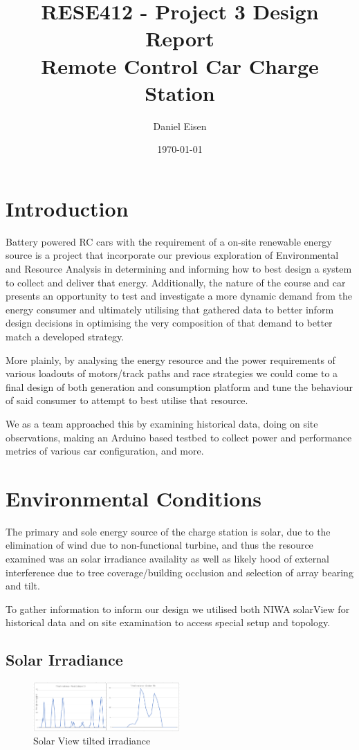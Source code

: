 \documentclass[11pt]{article}
\title{RESE412 - Project 3 Design Report \\ Remote Control Car Charge Station}
\author{Daniel Eisen}
\date{\today}
\begin{document}
\maketitle
\section{Introduction}
Battery powered RC cars with the requirement of a on-site renewable energy source is a project that incorporate our previous exploration of Environmental and Resource Analysis in determining and informing how to best design a system to collect and deliver that energy. Additionally, the nature of the course and car presents an opportunity to test and investigate a more dynamic demand from the energy consumer and ultimately utilising that gathered data to better inform design decisions in optimising the very composition of that demand to better match a developed strategy.

More plainly, by analysing the energy resource and the power requirements of various loadouts of motors/track paths and race strategies we could come to a final design of both generation and consumption platform and tune the behaviour of said consumer to attempt to best utilise that resource.  

We as a team approached this by examining historical data, doing on site observations, making an Arduino based testbed to collect power and performance metrics of various car configuration, and more.   

\section{Environmental Conditions}
The primary and sole energy source of the charge station is solar, due to the elimination of wind due to non-functional turbine, and thus the resource examined was an solar irradiance availality as well as likely hood of external interference due to tree coverage/building occlusion and selection of array bearing and tilt.

To gather information to inform our design we utilised both NIWA solarView \cite{solarview} for historical data and on site examination to access special setup and topology.

\subsection{Solar Irradiance}
\begin{figure}[h!]
    \begin{center}
        \includegraphics[width=0.5\textwidth]{inc/irr.png}
        \caption{Solar View tilted irradiance}
        \label{fig:solarview}
    \end{center}
\end{figure}
\end{document}
